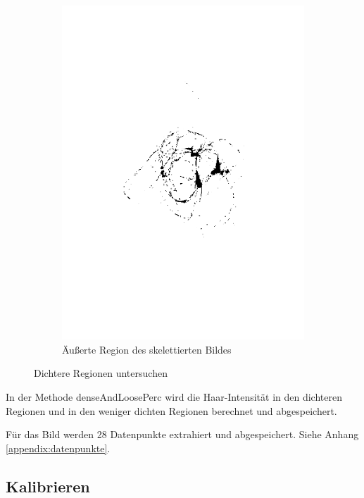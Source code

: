 \documentclass[german,a4paper, 12pt]{llncs}
\begin{document}
\begin{figure}
\begin{subfigure}[b]{0.475\textwidth}
		\includegraphics[width=\textwidth]{fig64/09outer section.png}
		\caption[]{Äußerte Region des skelettierten Bildes}
		\label{img:skelBGregion}
	\end{subfigure}
	\caption[  ]
	{\small Dichtere Regionen untersuchen} 
	\label{img:skelwarp}
\end{figure}

In der Methode denseAndLoosePerc wird die Haar-Intensität in den dichteren Regionen und in den weniger dichten Regionen berechnet und abgespeichert.

Für das Bild werden 28 Datenpunkte extrahiert und abgespeichert. Siehe Anhang \ref{appendix:datenpunkte}. 



\subsection{Kalibrieren}
\end{document}

